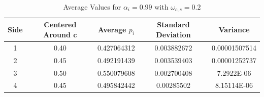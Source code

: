 \documentclass{article}
\begin{document}
\begin{table}[h!]
\centering
\caption{Average Values for $\alpha_i = 0.99$ with $\omega_{c,s} = 0.2$}
\label{tab:table1}
\begin{tabular}{|c|c|c|c|c|}
\hline
Side  & Centered Around c & Average $p_i$ & Standard Deviation & Variance\\
\hline
1 & 0.40 & 0.427064312 & 0.003882672 & 0.00001507514\\
2 & 0.45 & 0.492191439 & 0.003539403 & 0.00001252737\\
3 & 0.50 & 0.550079608 & 0.002700408 & 7.2922E-06\\
4 & 0.45 & 0.495842442 & 0.00285502 & 8.15114E-06\\
\hline
\end{tabular}
\end{table}
\end{document}
